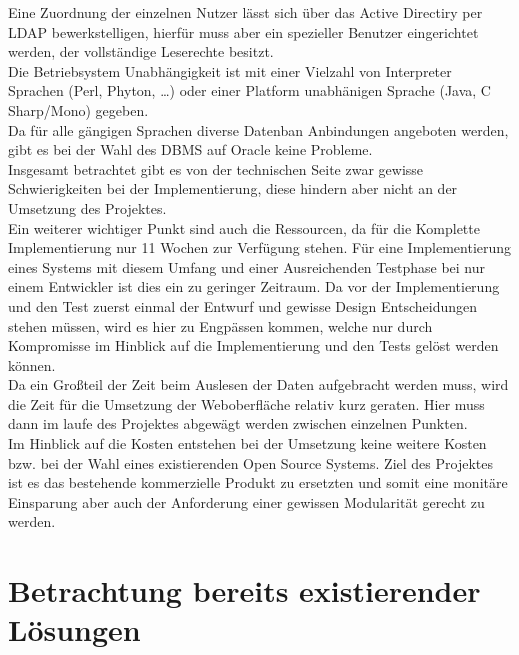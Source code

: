 Eine Zuordnung der einzelnen Nutzer lässt sich über das Active Directiry per LDAP bewerkstelligen, hierfür muss aber ein spezieller Benutzer eingerichtet werden, der vollständige Leserechte besitzt.\\
Die Betriebsystem Unabhängigkeit ist mit einer Vielzahl von Interpreter Sprachen (Perl, Phyton, …) oder einer Platform unabhänigen Sprache (Java, C Sharp/Mono) gegeben.\\
Da für alle gängigen Sprachen diverse Datenban Anbindungen angeboten werden, gibt es bei der Wahl des DBMS auf Oracle keine Probleme.\\
Insgesamt betrachtet gibt es von der technischen Seite zwar gewisse Schwierigkeiten bei der Implementierung, diese hindern aber nicht an der Umsetzung des Projektes.\\

Ein weiterer wichtiger Punkt sind auch die Ressourcen, da für die Komplette Implementierung nur 11 Wochen zur Verfügung stehen. Für eine Implementierung eines Systems mit diesem Umfang und einer Ausreichenden Testphase bei nur einem Entwickler ist dies ein zu geringer Zeitraum. Da vor der Implementierung und den Test zuerst einmal der Entwurf und gewisse Design Entscheidungen stehen müssen, wird es hier zu Engpässen kommen, welche nur durch Kompromisse im Hinblick auf die Implementierung und den Tests gelöst werden können.\\
Da ein Großteil der Zeit beim Auslesen der Daten aufgebracht werden muss, wird die Zeit für die Umsetzung der Weboberfläche relativ kurz geraten. Hier muss dann im laufe des Projektes abgewägt werden zwischen einzelnen Punkten.\\

Im Hinblick auf die Kosten entstehen bei der Umsetzung keine weitere Kosten bzw. bei der Wahl eines existierenden Open Source Systems. Ziel des Projektes ist es das bestehende kommerzielle Produkt zu ersetzten und somit eine monitäre Einsparung aber auch der Anforderung einer gewissen Modularität gerecht zu werden.\\

\section{Betrachtung bereits existierender Lösungen}
\label{sec:exitloesungen}


